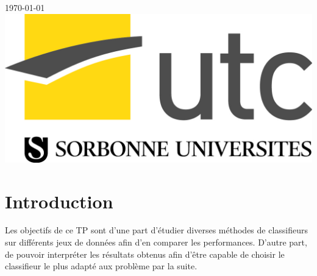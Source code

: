 \documentclass{article}
\begin{document}
\begin{titlepage}
{\large \today}\\[2cm] %


\includegraphics[scale=0.1]{logo_utc.jpg}\\[1cm] %
 

\vfill %

\end{titlepage}




\thispagestyle{fancy} %



\tableofcontents

\listoffigures
\listoftables

\newpage

\section*{Introduction}

Les objectifs de ce TP sont d'une part d'étudier diverses méthodes de classifieurs sur différents jeux de données afin d'en comparer les performances. D'autre part, de pouvoir interpréter les résultats obtenus afin d'être capable de choisir le classifieur le plus adapté aux problème par la suite.
\end{document}
